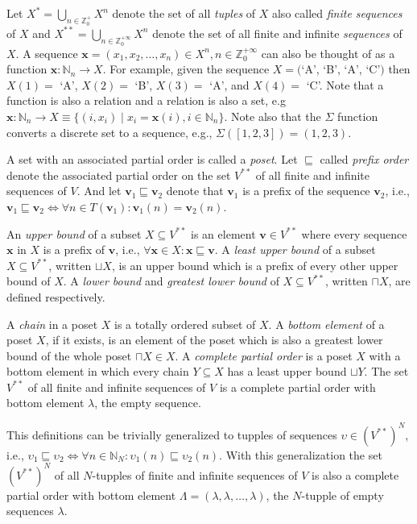 Let $X^* = \bigcup_{n \in \mathbb{Z}^+_0} X^n$ denote the set of all
\emph{tuples} of $X$ also called \emph{finite sequences} of $X$ and
$X^{**} = \bigcup_{n \in \mathbb{Z}^{+\infty}_0} X^n$ denote the set of all
finite and infinite \emph{sequences} of $X$. A sequence
$\mathbf{x} = (x_1,x_2,\ldots,x_n) \in X^n, n \in \mathbb{Z}^{+\infty}_0$
can also be thought of as a function $\mathbf{x} : \mathbb{N}_n \to X$.
For example, given the sequence $X = ($`A', `B', `A', `C'$)$ then
$X(1) =$ `A',  $X(2) =$ `B', $X(3) =$ `A', and $X(4) =$ `C'.
Note that a function is also a relation and a relation is also a set, e.g
$\mathbf{x} : \mathbb{N}_n \to X \equiv \{ (i,x_i) \mid x_i = \mathbf{x}(i), i \in \mathbb{N}_n \}$.
Note also that the $\Sigma$ function converts a discrete set to a sequence,
e.g., $\Sigma([1,2,3]) = (1,2,3)$.

A set with an associated partial order is called a
\emph{poset}. Let $\sqsubseteq$ called \emph{prefix order} denote the
associated partial order on the set $V^{**}$ of all finite and infinite sequences of $V$.
And let $\mathbf{v}_1 \sqsubseteq \mathbf{v}_2$ denote that
$\mathbf{v}_1$ is a prefix of the sequence $\mathbf{v}_2$, i.e.,
$\mathbf{v}_1 \sqsubseteq \mathbf{v}_2 \iff \forall{n \in T(\mathbf{v}_1)}: \mathbf{v}_1(n) = \mathbf{v}_2(n)$.

An \emph{upper bound} of a subset $X \subseteq V^{**}$ is an element
$\mathbf{v} \in V^{**}$ where every sequence $\mathbf{x}$ in $X$ is a
prefix of $\mathbf{v}$, i.e., $\forall{\mathbf{x} \in X}: \mathbf{x} \sqsubseteq \mathbf{v}$.
A \emph{least upper bound} of a subset $X \subseteq V^{**}$, written $\sqcup X$,
is an upper bound which is a prefix of every other upper bound of $X$.
A \emph{lower bound} and \emph{greatest lower bound} of $X \subseteq V^{**}$,
written $\sqcap X$, are defined respectively.

A \emph{chain} in a poset $X$ is a totally ordered subset of $X$. A
\emph{bottom element} of a poset $X$, if it exists, is an element of the
poset which is also a greatest lower bound of the whole poset $\sqcap X \in X$.
A \emph{complete partial order} is a poset $X$ with a bottom element
in which every chain $Y \subseteq X$ has a least upper bound
$\sqcup Y$. The set $V^{**}$ of all finite and infinite sequences of $V$
is a complete partial order with bottom element $\lambda$, the
empty sequence.

This definitions can be trivially generalized to tupples of sequences
$\upsilon \in (V^{**})^N$, i.e., $\upsilon_1 \sqsubseteq \upsilon_2 \iff
\forall{n \in \mathbb{N}_N}: \upsilon_1(n) \sqsubseteq \upsilon_2(n)$.
With this generalization the set $(V^{**})^N$ of all $N$-tupples of finite and
infinite sequences of $V$ is also a complete partial order with
bottom element $\Lambda = (\lambda, \lambda, \ldots, \lambda)$, the $N$-tupple
of empty sequences $\lambda$.

